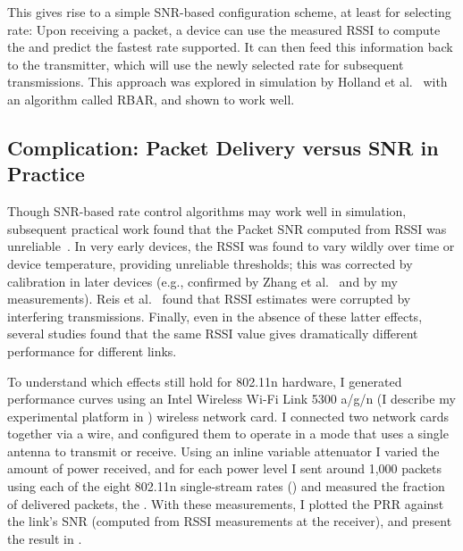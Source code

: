 This gives rise to a simple SNR-based configuration scheme, at least for selecting rate: Upon receiving a packet, a device can use the measured RSSI to compute the  and predict the fastest rate supported. It can then feed this information back to the transmitter, which will use the newly selected rate for subsequent transmissions. This approach was explored in simulation by Holland et al.~\cite{Holland_RBAR} with an algorithm called RBAR, and shown to work well.

\subsection{Complication: Packet Delivery versus SNR in Practice}
Though SNR-based rate control algorithms may work well in simulation, subsequent practical work found that the Packet SNR computed from RSSI was unreliable~\cite{Aguayo_Roofnet, Reis_interference, Zhao_sensys03}. In very early devices, the RSSI was found to vary wildly over time or device temperature, providing unreliable thresholds; this was corrected by calibration in later devices (e.g., confirmed by Zhang et al.~\cite{Zhang_SNRguided} and by my measurements). Reis et al.~\cite{Reis_interference} found that RSSI estimates were corrupted by interfering transmissions. Finally, even in the absence of these latter effects, several studies found that the same RSSI value gives dramatically different performance for different links.

To understand which effects still hold for 802.11n hardware, I generated performance curves using an Intel Wireless Wi-Fi Link 5300 a/g/n (I describe my experimental platform in ) wireless network card. I connected two network cards together via a wire, and configured them to operate in a mode that uses a single antenna to transmit or receive. Using an inline variable attenuator I varied the amount of power received, and for each power level I sent around 1,000 packets using each of the eight 802.11n single-stream rates () and measured the fraction of delivered packets, the . With these measurements, I plotted the PRR against the link's SNR (computed from RSSI measurements at the receiver), and present the result in . 

